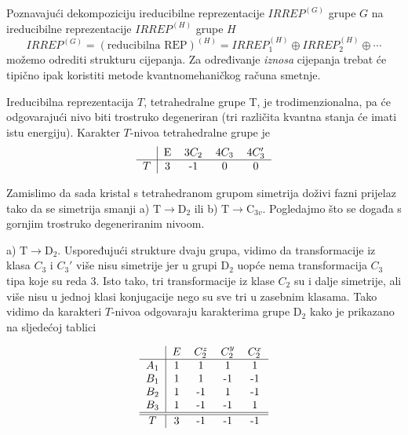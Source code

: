 \centerline{}
 
Poznavajući dekompoziciju ireducibilne reprezentacije $IRREP^{(G)}$
grupe $G$ na ireducibilne reprezentacije  $IRREP^{(H)}$ grupe $H$
\begin{displaymath}
   IRREP^{(G)}=(\text{reducibilna REP})^{(H)}=
 IRREP^{(H)}_1 \oplus IRREP^{(H)}_2 \oplus \cdots
\end{displaymath}
možemo odrediti strukturu cijepanja. Za određivanje \emph{iznosa} cijepanja
trebat će tipično ipak koristiti metode kvantnomehaničkog računa smetnje.

\begin{primjer}

Ireducibilna reprezentacija $T$, tetrahedralne grupe T, je
trodimenzionalna, pa će odgovarajući nivo biti trostruko degeneriran
(tri različita kvantna stanja će imati istu energiju).
Karakter $T$-nivoa tetrahedralne grupe je
\begin{displaymath}
\begin{tabular}{c|cccc}
  & E & 3$C_2$  & 4$C_3$ & 4$C_{3}'$ \\ \hline
 $T$ & 3  & -1 & 0 & 0 
\end{tabular}
\end{displaymath}

Zamislimo da sada kristal s tetrahedranom grupom simetrija doživi
fazni prijelaz tako da se
simetrija smanji a) $\mathrm{T}\to \mathrm{D}_2$ ili b) $\mathrm{T}\to
\mathrm{C}_{3v}$. Pogledajmo
što se događa s gornjim trostruko degeneriranim nivoom.

a) $\mathrm{T}\to \mathrm{D}_2$. Uspoređujući strukture dvaju grupa,
vidimo da transformacije iz klasa $C_3$ i $C_{3}'$ više nisu simetrije
jer u grupi $\mathrm{D}_2$ uopće nema transformacija $C_3$ tipa koje
su reda 3. Isto tako, tri transformacije iz klase $C_2$ su i dalje
simetrije, ali više nisu u jednoj klasi konjugacije nego su sve tri
u zasebnim klasama. Tako vidimo da karakteri $T$-nivoa odgovaraju
karakterima grupe D$_2$ kako je prikazano na sljedećoj tablici

\begin{displaymath}
\begin{tabular}{c|cccc}
 & $E$  & $C_{2}^z$ &  $C_{2}^y$ & $C_{2}^x$ \\ \hline
$A_1$ & 1 & 1& 1 & 1 \\
$B_1$ & 1 & 1&-1  & -1\\
$B_2$ & 1 & -1&1  & -1\\
$B_3$ & 1 & -1&-1  & 1\\ \hline \hline
 $T$ & 3 & -1 & -1 & -1
\end{tabular}
\end{displaymath}


\end{primjer}
